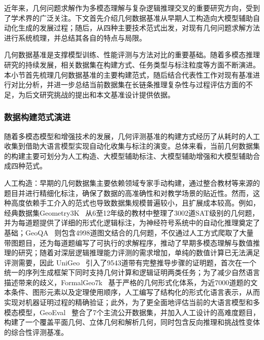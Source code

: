 
近年来，几何问题求解作为多模态理解与复杂逻辑推理交叉的重要研究方向，受到了学术界的广泛关注。下文首先介绍几何数据基准从早期人工构造向大模型辅助自动化生成的发展过程；随后，从四种主要技术范式出发，对现有几何问题求解方法进行系统梳理，并总结其各自的特点与局限。


几何数据基准是支撑模型训练、性能评测与方法对比的重要基础。随着多模态推理研究的持续发展，相关数据集在构建方式、任务类型与标注粒度等方面不断演进。本小节首先梳理几何数据基准的主要构建范式，随后结合代表性工作对现有基准进行对比分析，并进一步总结当前数据集在长链条推理复杂性与过程评估方面的不足，为后文研究挑战的提出和本文基准设计提供依据。

\subsubsection{数据构建范式演进}

随着多模态模型和增强技术的发展，几何评测基准的构建方式经历了从耗时的人工收集到借助大语言模型实现自动化收集与标注的演变。总体来看，当前几何数据集的构建主要可划分为人工构造、大模型辅助标注、大模型辅助增强和大模型辅助合成四种范式。

人工构造：早期的几何数据集主要依赖领域专家手动构建，通过整合教材等来源的题目并进行精细化标注，确保了数据的高准确性和对教学场景的贴近性。然而，这种高度依赖手工介入的范式也导致数据集规模普遍较小，且扩展成本较高。例如，经典数据集Geometry3K~\cite{lu2021intergps} 从6至12年级的教材中整理了3002道SAT级别的几何题，并为每道题提供了详细的形式化逻辑标注，为神经符号系统中的自动化推理奠定了基础；GeoQA~\cite{chen2021geoqa} 则包含4998道图文结合的几何题，不仅通过人工方式爬取了大量带图题目，还为每道题编写了可执行的求解程序，推动了早期多模态理解与数值推理的研究；随着对深层逻辑推理能力评测的需求增加，单纯的数值计算已无法满足评测需要，因此 UniGeo~\cite{chen2022unigeo} 引入了9543道带有完整推导步骤的证明题，首次在一个统一的序列生成框架下同时支持几何计算和逻辑证明两类任务；为了减少自然语言描述带来的歧义，FormalGeo7k~\cite{zhang2023formalgeo} 基于严格的几何形式化体系，为近7000道题的文本条件、图形元素以及定理使用顺序，人工编写了结构化的形式化语言表示，从而实现对机器证明过程的精确验证；此外，为了更全面地评估当前的大语言模型和多模态模型，GeoEval~\cite{zhang2024geoeval} 整合了7个主流公开数据集，并加入人工设计的高难度题目，构建了一个覆盖平面几何、立体几何和解析几何，同时包含反向推理和挑战性变体的综合性评测基准。

